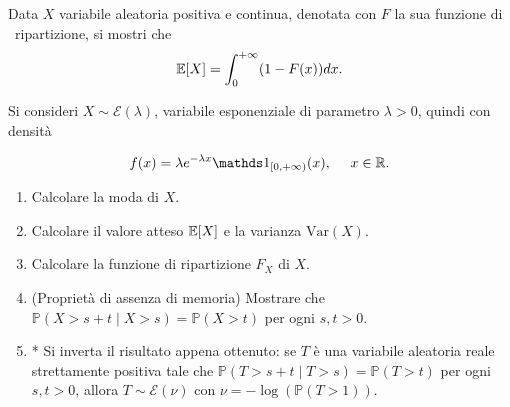 Data $X$ variabile aleatoria positiva e continua, denotata con $F$ la sua funzione di \ ripartizione, si mostri che
\begin{equation*}
\mathbb{E}[ X] =\int _{0}^{+\infty }( 1-F( x)) dx.
\end{equation*}

Si consideri $X\sim \mathcal{E}( \lambda )$, variabile esponenziale di parametro $\lambda  >0$, quindi con densità


\begin{equation*}
f( x) =\lambda e^{-\lambda x} \Ind_{[ 0,+\infty )}( x) ,\ \ \ \ x\in \mathbb{R} .
\end{equation*}
\begin{enumerate}
\item Calcolare la moda di $X$.
\item Calcolare il valore atteso $\mathbb{E}[ X]$ e la varianza $\mathrm{Var}( X)$.
\item Calcolare la funzione di ripartizione $F_{X}$ di $X$.
\item (Proprietà di assenza di memoria) Mostrare che $\mathbb{P}( X >s+t \mid X >s) =\mathbb{P}( X >t)$ per ogni $s,t >0$.
\item * Si inverta il risultato appena ottenuto: se $T$ è una variabile aleatoria reale strettamente positiva tale che $\mathbb{P}( T >s+t\mid T >s) =\mathbb{P}( T >t)$ per ogni $s,t >0$, allora $T\sim \mathcal{E}( \nu )$ con $\nu =-\log(\mathbb{P}( T >1))$.
\end{enumerate}

